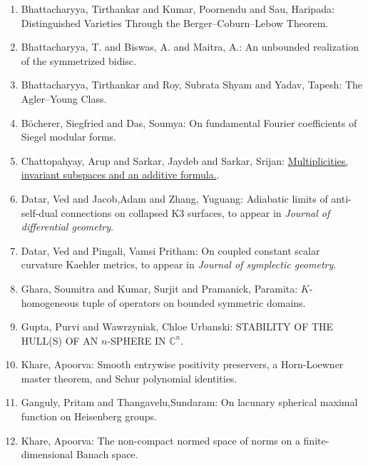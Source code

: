 \begin{enumerate}[resume, leftmargin=27pt]
	\item Bhattacharyya, Tirthankar and Kumar, Poornendu and Sau, Haripada: Distinguished Varieties Through the Berger--Coburn--Lebow Theorem.

	\item Bhattacharyya, T. and  Biswas, A. and Maitra, A.: An unbounded realization of the symmetrized bidisc.


	\item Bhattacharyya, Tirthankar and  Roy, Subrata Shyam and Yadav, Tapesh: The Agler--Young Class.

	\item B{\"o}cherer, Siegfried and Das, Soumya: On fundamental Fourier coefficients of Siegel modular forms.

	\item Chattopahyay, Arup and Sarkar, Jaydeb and Sarkar, Srijan: \href{https://arxiv.org/abs/1812.05435}{Multiplicities, invariant subspaces and an additive formula.}.

	\item\label{datar:K3-surfaces} Datar, Ved and Jacob,Adam and Zhang, Yuguang: Adiabatic limits of anti-self-dual
	      connections on collapsed K3 surfaces, to appear in \emph{Journal of differential geometry}.

	\item\label{datar-pingali:Kahler-metrics} Datar, Ved and Pingali, Vamsi Pritham: On coupled constant scalar curvature Kaehler
	      metrics, to appear in \emph{Journal of symplectic geometry}.

	\item Ghara, Soumitra and Kumar, Surjit and Pramanick, Paramita: $K$-homogeneous tuple of operators on bounded symmetric domains.

	\item Gupta, Purvi and Wawrzyniak, Chloe Urbanski: STABILITY OF THE HULL(S) OF AN $n$-SPHERE IN $\mathbb{C}^n$.

	\item\label{khare:schur-polynomial-identities} Khare, Apoorva: Smooth entrywise positivity preservers, a
	      Horn-Loewner master theorem, and Schur polynomial identities.

	\item Ganguly, Pritam and Thangavelu,Sundaram: On lacunary spherical maximal function on Heisenberg groups.

	\item Khare, Apoorva: The non-compact normed space of norms on a finite-dimensional Banach space.


\end{enumerate}
